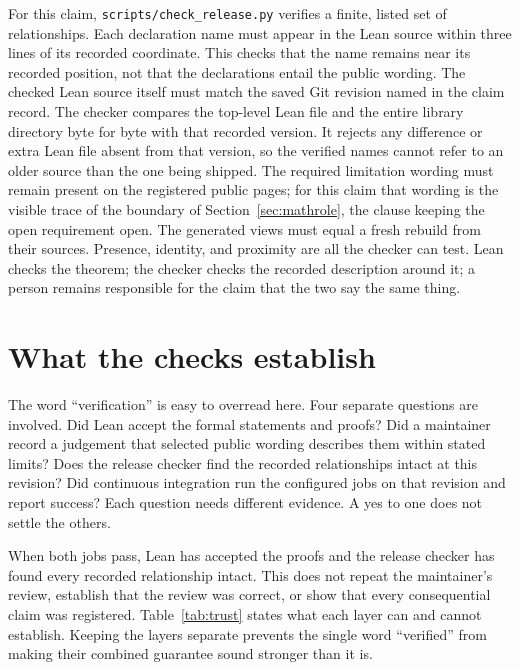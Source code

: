 \documentclass[11pt]{article}
\begin{document}
For this claim, \texttt{scripts/check\_release.py} verifies a finite, listed set of
relationships.  Each declaration name must appear in the Lean
source within three lines of its recorded coordinate.  This checks that the
name remains near its recorded position, not that the declarations entail the
public wording.  The checked Lean source itself must match the saved Git revision
named in the claim record.  The checker compares the top-level Lean file and the
entire library directory byte for byte with that recorded version.  It rejects
any difference or extra Lean file absent from that version, so the verified names
cannot refer to an older source than the one
being shipped.  The
required limitation wording must remain present on the registered public
pages; for this claim that wording is the visible trace of the boundary of
Section~\ref{sec:mathrole}, the clause keeping the open requirement open.
The generated views must equal a fresh rebuild from their sources.
Presence, identity, and proximity are all the checker can test.  Lean checks
the theorem; the checker checks the recorded description around it; a person
remains responsible for the claim that the two say the same thing.

\section{What the checks establish}\label{sec:trust}

The word ``verification'' is easy to overread here.  Four separate questions
are involved.  Did Lean accept the formal statements and proofs?  Did a
maintainer record a judgement that selected public wording describes them
within stated limits?  Does the release checker find the recorded
relationships intact at this revision?  Did continuous integration run the
configured jobs on that revision and report success?  Each question needs
different evidence.  A yes to one does not settle the others.

When both jobs pass, Lean has accepted the proofs and the release checker has
found every recorded relationship intact.  This does not repeat the
maintainer's review, establish that the review was correct, or show that every
consequential claim was registered.
Table~\ref{tab:trust} states what each layer can and cannot establish.  Keeping
the layers separate prevents the single word ``verified'' from making their
combined guarantee sound stronger than it is.
\end{document}
